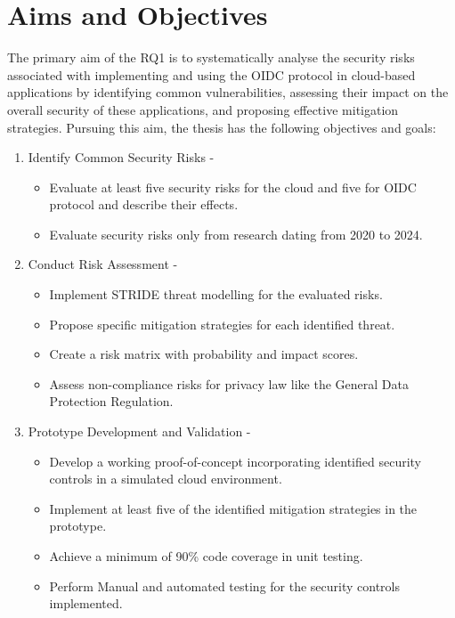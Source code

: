 \section{Aims and Objectives}
The primary aim of the RQ1 is to systematically analyse the security risks associated with implementing and using the OIDC protocol in cloud-based applications by identifying common vulnerabilities, assessing their impact on the overall security of these applications, and proposing effective mitigation strategies. Pursuing this aim, the thesis has the following objectives and goals:

\begin{enumerate}
  \item Identify Common Security Risks - 
  \begin{itemize}
      \item Evaluate at least five security risks for the cloud and five for OIDC protocol and describe their effects.
      \item Evaluate security risks only from research dating from 2020 to 2024.
  \end{itemize}

    
  \item Conduct Risk Assessment  - 
  \begin{itemize}
      \item Implement STRIDE threat modelling for the evaluated risks.
      \item Propose specific mitigation strategies for each identified threat.
      \item Create a risk matrix with probability and impact scores.
      \item Assess non-compliance risks for privacy law like the General Data Protection Regulation. 
  \end{itemize}
  \item Prototype Development and Validation - 
  \begin{itemize}
      \item Develop a working proof-of-concept incorporating identified security controls in a simulated cloud environment.
      \item Implement at least five of the identified mitigation strategies in the prototype.
      \item Achieve a minimum of 90\% code coverage in unit testing.
      \item Perform Manual and automated testing for the security controls implemented.
  \end{itemize}
\end{enumerate}

